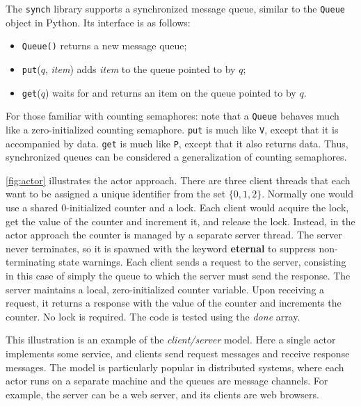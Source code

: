 \documentclass{report}
\begin{document}
The \texttt{synch} library supports a synchronized message queue,
similar to the \texttt{Queue} object in Python.
Its interface is as follows:
\begin{itemize}
\item \texttt{Queue()} returns a new message queue;
\item \texttt{put}($q$, \textit{item}) adds \textit{item} to the queue pointed to by $q$;
\item \texttt{get}($q$) waits for and returns an item on the queue pointed to by $q$.
\end{itemize}

For those familiar with counting semaphores: note that a \texttt{Queue}
behaves much like a zero-initialized counting semaphore.
\texttt{put} is much like \texttt{V}, except that it is accompanied by data.
\texttt{get} is much like \texttt{P}, except that it also returns data.
Thus, synchronized queues can be considered a generalization of
counting semaphores.

\autoref{fig:actor} illustrates the actor approach.
There are three client threads that each want to be assigned
a unique identifier from the set $\{ 0, 1, 2 \}$.
Normally one would use a shared 0-initialized counter and a lock.
Each client would acquire the lock, get the value of the counter
and increment it, and release the lock.
Instead, in the actor approach the counter is managed by a
separate server thread.
The server never terminates, so it is spawned with the keyword
\textbf{eternal} to suppress non-terminating state warnings.
Each client sends a request to the server, consisting in this case
of simply the queue to which the server must send the response.
The server maintains a local, zero-initialized counter variable.
Upon receiving a request, it returns a response with the value of
the counter and increments the counter.  No lock is required.
The code is tested using the \textit{done} array.

This illustration is an example of the \emph{client/server} model.
Here a single actor implements some service, and clients send request
messages and receive response messages.  The model is particularly
popular in distributed systems, where each actor runs on a separate
machine and the queues are message channels.  For example, the server
can be a web server, and its clients are web browsers.
\end{document}
